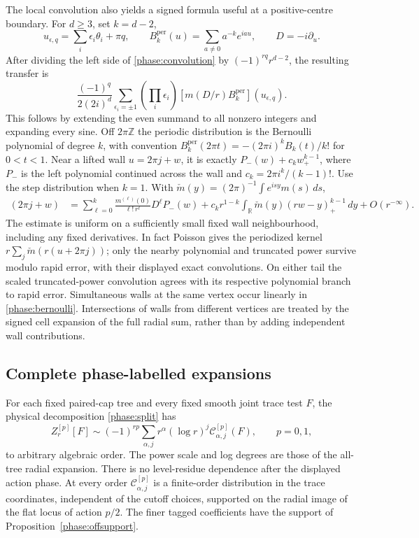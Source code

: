 The local convolution also yields a signed formula useful at a positive-centre boundary. For \(d\ge3\), set \(k=d-2\),
\[
 u_{\epsilon,q}=\sum_i\epsilon_i\theta_i+\pi q,\qquad
 B_k^{\mathrm{per}}(u)=\sum_{a\ne0}a^{-k}e^{iau},\qquad D=-i\partial_u.
\]
After dividing the left side of \eqref{phase:convolution} by \((-1)^{rq}r^{d-2}\), the resulting transfer is
\begin{equation}
 \frac{(-1)^q}{2(2i)^d}
 \sum_{\epsilon_i=\pm1}\left(\prod_i\epsilon_i\right)
       [m(D/r)B_k^{\mathrm{per}}](u_{\epsilon,q}).
 \label{phase:bernoulli}
\end{equation}
This follows by extending the even summand to all nonzero integers and expanding every sine. Off \(2\pi\mathbb Z\) the periodic distribution is the Bernoulli polynomial of degree \(k\), with convention
\(B_k^{\mathrm{per}}(2\pi t)=-(2\pi i)^k B_k(t)/k!\) for \(0<t<1\).
Near a lifted wall \(u=2\pi j+w\), it is exactly \(P_-(w)+c_k w_+^{k-1}\), where \(P_-\) is the left polynomial continued across the wall and \(c_k=2\pi i^k/(k-1)!\). Use the step distribution when \(k=1\). With \(\check m(y)=(2\pi)^{-1}\int e^{isy}m(s)\,ds\),
\begin{align}
 [m(D/r)B_k^{\mathrm{per}}](2\pi j+w)
 &=\sum_{\ell=0}^{k}\frac{m^{(\ell)}(0)}{\ell!\,r^\ell}D^\ell P_-(w)
   +c_k r^{1-k}\int_{\mathbb R}\check m(y)(rw-y)_+^{k-1}\,dy
   +O(r^{-\infty}).
 \label{phase:wall}
\end{align}
The estimate is uniform on a sufficiently small fixed wall neighbourhood, including any fixed derivatives. In fact Poisson gives the periodized kernel \(r\sum_j\check m(r(u+2\pi j))\); only the nearby polynomial and truncated power survive modulo rapid error, with their displayed exact convolutions. On either tail the scaled truncated-power convolution agrees with its respective polynomial branch to rapid error. Simultaneous walls at the same vertex occur linearly in \eqref{phase:bernoulli}. Intersections of walls from different vertices are treated by the signed cell expansion of the full radial sum, rather than by adding independent wall contributions.

\subsection{Complete phase-labelled expansions}
\label{phase:all-orders}

\begin{theorem}
\label{phase:main}
For each fixed paired-cap tree and every fixed smooth joint trace test \(F\), the physical decomposition \eqref{phase:split} has
\[
 Z_r^{[p]}[F]\sim (-1)^{rp}
     \sum_{\alpha,j}r^\alpha(\log r)^j\mathcal C_{\alpha,j}^{[p]}(F),
       \qquad p=0,1,
\]
to arbitrary algebraic order. The power scale and log degrees are those of the all-tree radial expansion. There is no level-residue dependence after the displayed action phase. At every order \(\mathcal C_{\alpha,j}^{[p]}\) is a finite-order distribution in the trace coordinates, independent of the cutoff choices, supported on the radial image of the flat locus of action \(p/2\). The finer tagged coefficients have the support of Proposition~\ref{phase:offsupport}.
\end{theorem}

